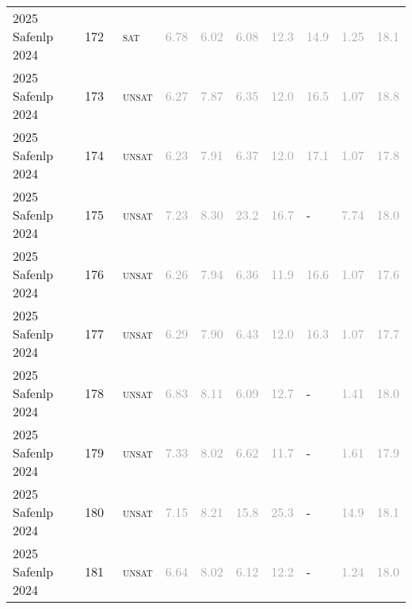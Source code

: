 \begin{center}
{\begin{longtable}{@{}llllllllll@{}}
2025 Safenlp 2024 & 172 & ~\textsc{sat} & \textcolor{darkgray}{6.78} & \textcolor{darkgray}{6.02} & \textcolor{darkgray}{6.08} & \textcolor{darkgray}{12.3} & \textcolor{darkgray}{14.9} & \textcolor{darkgray}{1.25} & \textcolor{darkgray}{18.1} \\
2025 Safenlp 2024 & 173 & ~\textsc{unsat} & \textcolor{darkgray}{6.27} & \textcolor{darkgray}{7.87} & \textcolor{darkgray}{6.35} & \textcolor{darkgray}{12.0} & \textcolor{darkgray}{16.5} & \textcolor{darkgray}{1.07} & \textcolor{darkgray}{18.8} \\
2025 Safenlp 2024 & 174 & ~\textsc{unsat} & \textcolor{darkgray}{6.23} & \textcolor{darkgray}{7.91} & \textcolor{darkgray}{6.37} & \textcolor{darkgray}{12.0} & \textcolor{darkgray}{17.1} & \textcolor{darkgray}{1.07} & \textcolor{darkgray}{17.8} \\
2025 Safenlp 2024 & 175 & ~\textsc{unsat} & \textcolor{darkgray}{7.23} & \textcolor{darkgray}{8.30} & \textcolor{darkgray}{23.2} & \textcolor{darkgray}{16.7} & - & \textcolor{darkgray}{7.74} & \textcolor{darkgray}{18.0} \\
2025 Safenlp 2024 & 176 & ~\textsc{unsat} & \textcolor{darkgray}{6.26} & \textcolor{darkgray}{7.94} & \textcolor{darkgray}{6.36} & \textcolor{darkgray}{11.9} & \textcolor{darkgray}{16.6} & \textcolor{darkgray}{1.07} & \textcolor{darkgray}{17.6} \\
2025 Safenlp 2024 & 177 & ~\textsc{unsat} & \textcolor{darkgray}{6.29} & \textcolor{darkgray}{7.90} & \textcolor{darkgray}{6.43} & \textcolor{darkgray}{12.0} & \textcolor{darkgray}{16.3} & \textcolor{darkgray}{1.07} & \textcolor{darkgray}{17.7} \\
2025 Safenlp 2024 & 178 & ~\textsc{unsat} & \textcolor{darkgray}{6.83} & \textcolor{darkgray}{8.11} & \textcolor{darkgray}{6.09} & \textcolor{darkgray}{12.7} & - & \textcolor{darkgray}{1.41} & \textcolor{darkgray}{18.0} \\
2025 Safenlp 2024 & 179 & ~\textsc{unsat} & \textcolor{darkgray}{7.33} & \textcolor{darkgray}{8.02} & \textcolor{darkgray}{6.62} & \textcolor{darkgray}{11.7} & - & \textcolor{darkgray}{1.61} & \textcolor{darkgray}{17.9} \\
2025 Safenlp 2024 & 180 & ~\textsc{unsat} & \textcolor{darkgray}{7.15} & \textcolor{darkgray}{8.21} & \textcolor{darkgray}{15.8} & \textcolor{darkgray}{25.3} & - & \textcolor{darkgray}{14.9} & \textcolor{darkgray}{18.1} \\
2025 Safenlp 2024 & 181 & ~\textsc{unsat} & \textcolor{darkgray}{6.64} & \textcolor{darkgray}{8.02} & \textcolor{darkgray}{6.12} & \textcolor{darkgray}{12.2} & - & \textcolor{darkgray}{1.24} & \textcolor{darkgray}{18.0} \\

\end{longtable}}
\end{center}
